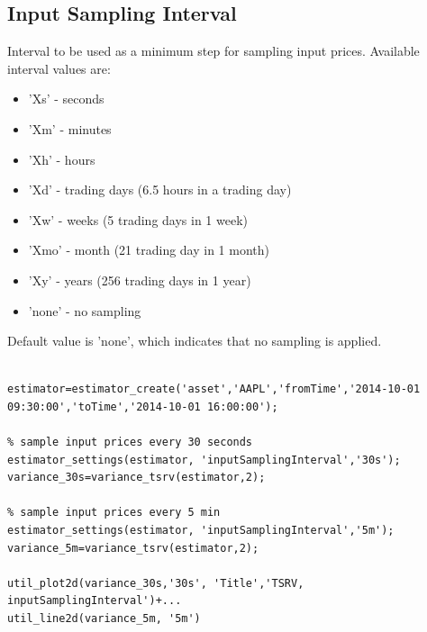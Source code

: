 \documentclass[letterpaper]{report}
\begin{document}
\subsection{Input Sampling Interval}
Interval to be used as a minimum step for sampling input prices. Available interval values are: 
\begin{itemize} 
  \item 'Xs' - seconds
  \item 'Xm' - minutes
  \item 'Xh' - hours
  \item 'Xd' - trading days (6.5 hours in a trading day)
  \item 'Xw' - weeks (5 trading days in 1 week)
  \item 'Xmo' - month (21 trading day in 1 month)
  \item 'Xy' - years (256 trading days in 1 year)
  \item 'none' - no sampling
\end{itemize}
Default value is 'none', which indicates that no sampling is applied.
\begin{lstlisting}

estimator=estimator_create('asset','AAPL','fromTime','2014-10-01 09:30:00','toTime','2014-10-01 16:00:00');

% sample input prices every 30 seconds
estimator_settings(estimator, 'inputSamplingInterval','30s');
variance_30s=variance_tsrv(estimator,2);

% sample input prices every 5 min
estimator_settings(estimator, 'inputSamplingInterval','5m');
variance_5m=variance_tsrv(estimator,2);

util_plot2d(variance_30s,'30s', 'Title','TSRV, inputSamplingInterval')+...
util_line2d(variance_5m, '5m')
\end{lstlisting}
\end{document}
